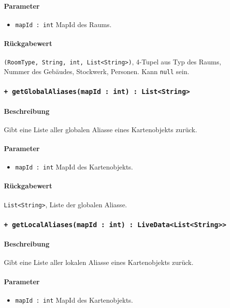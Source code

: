 \paragraph*{Parameter}
\begin{itemize}
    \item \texttt{mapId : int} MapId des Raums.
\end{itemize}
\paragraph*{Rückgabewert}
\texttt{(RoomType, String, int, List<String>)}, 4-Tupel aus Typ des Raums, Nummer des Gebäudes, Stockwerk, Personen. Kann \texttt{null} sein.

\subsubsection*{\texttt{+ getGlobalAliases(mapId : int) : List<String>}}%
\paragraph*{Beschreibung}
Gibt eine Liste aller globalen Aliasse eines Kartenobjekts zurück.
\paragraph*{Parameter}
\begin{itemize}
    \item \texttt{mapId : int} MapId des Kartenobjekts.
\end{itemize}
\paragraph*{Rückgabewert}
\texttt{List<String>}, Liste der globalen Aliasse.

\subsubsection*{\texttt{+ getLocalAliases(mapId : int) : LiveData<List<String>>}}%
\paragraph*{Beschreibung}
Gibt eine Liste aller lokalen Aliasse eines Kartenobjekts zurück.
\paragraph*{Parameter}
\begin{itemize}
    \item \texttt{mapId : int} MapId des Kartenobjekts.
\end{itemize}
